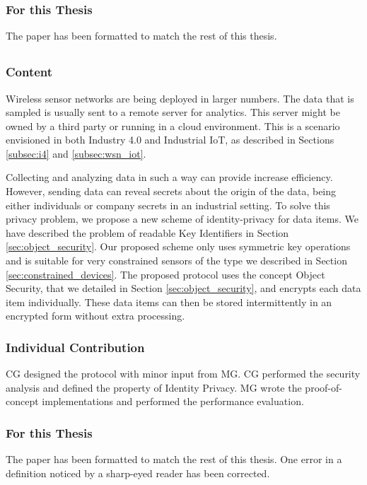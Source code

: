 \subsubsection{For this Thesis}
The paper has been formatted to match the rest of this thesis.


\subsection{\paperIItitle}
\subsubsection{Content}
Wireless sensor networks are being deployed in larger numbers. The data that is sampled is usually sent to a remote server for analytics. This server might be owned by a third party or running in a cloud environment. This is a scenario envisioned in both Industry 4.0 and Industrial IoT, as described in Sections \ref{subsec:i4} and \ref{subsec:wsn_iot}.

Collecting and analyzing data in such a way can provide increase efficiency. However, sending data can reveal secrets about the origin of the data, being either individuals or company secrets in an industrial setting. To solve this privacy problem, we propose a new scheme of identity-privacy for data items. We have described the problem of readable Key Identifiers in Section \ref{sec:object_security}. Our proposed scheme only uses symmetric key operations and is suitable for very constrained sensors of the type we described in Section \ref{sec:constrained_devices}. The proposed protocol uses the concept Object Security, that we detailed in Section \ref{sec:object_security}, and encrypts each data item individually. These data items can then be stored intermittently in an encrypted form without extra processing.
\subsubsection{Individual Contribution}
CG designed the protocol with minor input from MG. CG performed the security analysis and defined the property of Identity Privacy. MG wrote the proof-of-concept implementations and performed the performance evaluation.
\subsubsection{For this Thesis}
The paper has been formatted to match the rest of this thesis. One error in a definition noticed by a sharp-eyed reader has been corrected.



